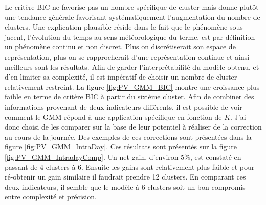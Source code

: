 \documentclass[12pt]{report}
\begin{document}
Le critère BIC ne favorise pas un nombre spécifique de cluster mais donne plutôt une tendance générale favorisant systématiquement l'augmentation du nombre de clusters. Une explication plausible réside dans le fait que le phénomène sous-jacent, l'évolution du temps au sens météorologique du terme, est par définition un phénomène continu et non discret. Plus on discrétiserait son espace de représentation, plus on se rapprocherait d'une représentation continue et ainsi meilleurs sont les résultats. Afin de garder l'interprétabilité du modèle obtenu, et d'en limiter sa complexité, il est impératif de choisir un nombre de cluster relativement restreint. La figure \ref{fig:PV_GMM_BIC} montre une croissance plus faible en terme de critère BIC à partir du sixième cluster. Afin de combiner des informations provenant de deux indicateurs différents, il est possible de voir comment le GMM répond à une application spécifique en fonction de $K$. J'ai donc choisi de les comparer sur la base de leur potentiel à réaliser de la correction au cours de la journée. Des exemples de ces corrections sont présentées dans la figure \ref{fig:PV_GMM_IntraDay}. Ces résultats sont présentés sur la figure \ref{fig:PV_GMM_IntradayComp}. Un net gain, d'environ $5\%$, est constaté en passant de 4 clusters à 6. Ensuite les gains sont relativement plus faible et pour ré-obtenir un gain similaire il faudrait prendre 12 clusters. En comparant ces deux indicateurs, il semble que le modèle à 6 clusters soit un bon compromis entre complexité et précision.
\end{document}
